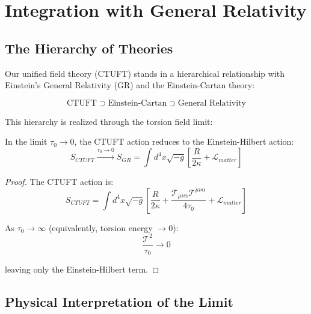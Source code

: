 \section{Integration with General Relativity}
\label{sec:gr_integration}

\subsection{The Hierarchy of Theories}

Our unified field theory (CTUFT) stands in a hierarchical relationship with Einstein's General Relativity (GR) and the Einstein-Cartan theory:

\begin{equation}
    \text{CTUFT} \supset \text{Einstein-Cartan} \supset \text{General Relativity}
    \label{eq:theory_hierarchy}
\end{equation}

This hierarchy is realized through the torsion field limit:

\begin{theorem}
In the limit $\tau_0 \to 0$, the CTUFT action reduces to the Einstein-Hilbert action:
\begin{equation}
    S_{CTUFT} \xrightarrow{\tau_0 \to 0} S_{GR} = \int d^4x \sqrt{-g} \left[\frac{R}{2\kappa} + \mathcal{L}_{matter}\right]
\end{equation}
\end{theorem}

\begin{proof}
The CTUFT action is:
\begin{equation}
    S_{CTUFT} = \int d^4x \sqrt{-g} \left[\frac{R}{2\kappa} + \frac{\mathcal{T}_{\mu\nu\alpha}\mathcal{T}^{\mu\nu\alpha}}{4\tau_0} + \mathcal{L}_{matter}\right]
\end{equation}

As $\tau_0 \to \infty$ (equivalently, torsion energy $\to 0$):
\begin{equation}
    \frac{\mathcal{T}^2}{\tau_0} \to 0
\end{equation}

leaving only the Einstein-Hilbert term.
\end{proof}

\subsection{Physical Interpretation of the Limit}

